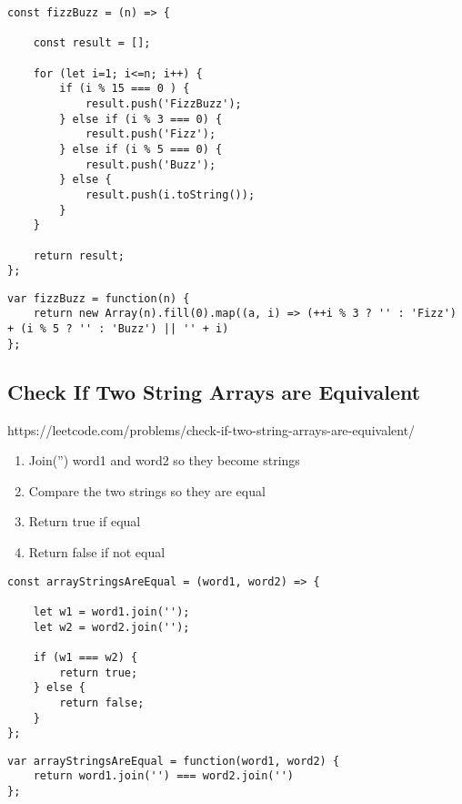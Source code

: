 \documentclass[10pt]{article}
\begin{document}
\begin{lstlisting}[title=Solution fizzBuzz with for loop, captionpos=t]
const fizzBuzz = (n) => {

    const result = [];
    
    for (let i=1; i<=n; i++) {
        if (i % 15 === 0 ) {
            result.push('FizzBuzz');
        } else if (i % 3 === 0) {
            result.push('Fizz');
        } else if (i % 5 === 0) {
            result.push('Buzz');
        } else {
            result.push(i.toString());
        }
    }
    
    return result;
};
\end{lstlisting}

\begin{lstlisting}[title=Solution fizzBuzz ES6, captionpos=t]
var fizzBuzz = function(n) {
    return new Array(n).fill(0).map((a, i) => (++i % 3 ? '' : 'Fizz') + (i % 5 ? '' : 'Buzz') || '' + i)
};
\end{lstlisting}
\medskip %







\pagebreak %
\medskip 
\subsection{Check If Two String Arrays are Equivalent}
https://leetcode.com/problems/check-if-two-string-arrays-are-equivalent/

\begin{enumerate}
	\item Join('') word1 and word2 so they become strings
	\item Compare the two strings so they are equal
	\item Return true if equal
	\item Return false if not equal
\end{enumerate}

\begin{lstlisting}[title=Solution arrayStringsAreEqual, captionpos=t]
const arrayStringsAreEqual = (word1, word2) => {
    
    let w1 = word1.join('');
    let w2 = word2.join('');
    
    if (w1 === w2) {
        return true;
    } else {
        return false;
    }
};
\end{lstlisting}

\begin{lstlisting}[title=Solution arrayStringsAreEqual ES6, captionpos=t]
var arrayStringsAreEqual = function(word1, word2) {
    return word1.join('') === word2.join('')
};
\end{lstlisting}
\medskip %
\end{document}
